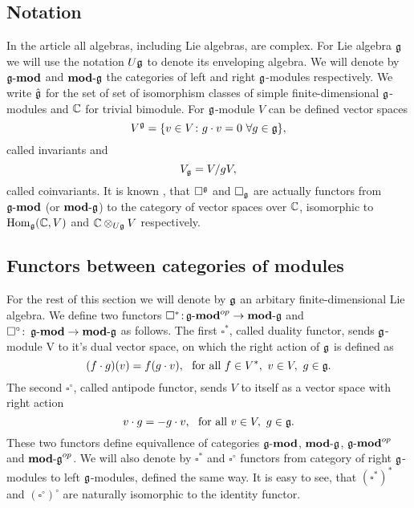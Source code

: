 % 

\subsection{Notation} 
In the article all algebras, including Lie algebras, are complex. 
For Lie algebra $\mathfrak{g}$ we will use the notation $U\mathfrak{g}$ to denote its enveloping algebra. We will
denote by $\operatorname{\mathbf{\mathfrak{g}-mod}}$ and $\operatorname{\mathbf{mod-\mathfrak{g}}}$ the categories of left and right $\mathfrak{g}$-modules respectively. 
We write $\hat{\mathfrak{g}}$ for the set of set of isomorphism classes of simple finite-dimensional
$\mathfrak{g}$-modules and $\mathbb{C}$ for trivial bimodule. 
For $\mathfrak{g}$-module $V$ can be defined vector spaces 
\begin{equation}
    V^{\mathfrak{g}} = \{v\in V\colon g\cdot v = 0 ~ \forall g\in \mathfrak{g} \}, 
\end{equation}
called invariants and
\begin{equation}
    V_{\mathfrak{g}} = V/gV,
\end{equation}
called coinvariants. It is known , that $\square^{\mathfrak{g}}$ and $\square_{\mathfrak{g}}$ are actually functors
from $\operatorname{\mathbf{\mathfrak{g}-mod}}$ (or $\operatorname{\mathbf{mod-\mathfrak{g}}}$) to the category of vector spaces over $\mathbb{C}$, isomorphic to
$\operatorname{Hom}_{\mathfrak{g}}(\mathbb{C}, V)$ and $\mathbb{C} \otimes_{U\mathfrak{g}} V$ respectively. 

\subsection{Functors between categories of modules}
For the rest of this section we will denote by $\mathfrak{g}$ an arbitary finite-dimensional Lie algebra.
We define two functors $\square^*\colon \\ \operatorname{\mathbf{\mathfrak{g}-mod}}^{op} \to \operatorname{\mathbf{mod-\mathfrak{g}}}$ and $\square^\circ\colon
\operatorname{\mathbf{\mathfrak{g}-mod}} \to \operatorname{\mathbf{mod-\mathfrak{g}}}$ as follows. The first $\square^*$, called duality functor, sends 
$\mathfrak{g}$-module V to it's dual vector space, on which the right action of $\mathfrak{g}$ is defined as 
\[
    (f\cdot g) (v) = f(g\cdot v),~\text{ for all } f\in V^*,~v \in V,~g\in\mathfrak{g}.
\]
The second $\square^\circ$, called antipode functor, sends $V$ to itself as a vector space with right
action
\[\label{test}
    v\cdot g = - g\cdot v,~\text{ for all } v \in V,~g\in\mathfrak{g}.
\]
These two functors define equivallence of categories $\operatorname{\mathbf{\mathfrak{g}-mod}}$, $\operatorname{\mathbf{mod-\mathfrak{g}}}$, $\operatorname{\mathbf{\mathfrak{g}-mod}}^{op}$
and $\operatorname{\mathbf{mod-\mathfrak{g}}}^{op}$. We will also denote by $\square^*$ and $\square^\circ$ functors from
category of right $\mathfrak{g}$-modules to left $\mathfrak{g}$-modules, defined the same way. It is easy to
see, that $(\square^*)^*$ and $(\square^\circ)^\circ$ are naturally isomorphic to the identity functor.

